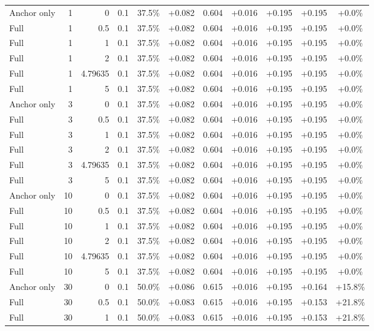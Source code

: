 \begin{table}[htbp]
\begin{tabular}{lrrrccccccc}
Anchor only & 1 & 0 & 0.1 & 37.5\% & +0.082 & 0.604 & +0.016 & +0.195 & +0.195 & +0.0\% \\
Full & 1 & 0.5 & 0.1 & 37.5\% & +0.082 & 0.604 & +0.016 & +0.195 & +0.195 & +0.0\% \\
Full & 1 & 1 & 0.1 & 37.5\% & +0.082 & 0.604 & +0.016 & +0.195 & +0.195 & +0.0\% \\
Full & 1 & 2 & 0.1 & 37.5\% & +0.082 & 0.604 & +0.016 & +0.195 & +0.195 & +0.0\% \\
Full & 1 & 4.79635 & 0.1 & 37.5\% & +0.082 & 0.604 & +0.016 & +0.195 & +0.195 & +0.0\% \\
Full & 1 & 5 & 0.1 & 37.5\% & +0.082 & 0.604 & +0.016 & +0.195 & +0.195 & +0.0\% \\
Anchor only & 3 & 0 & 0.1 & 37.5\% & +0.082 & 0.604 & +0.016 & +0.195 & +0.195 & +0.0\% \\
Full & 3 & 0.5 & 0.1 & 37.5\% & +0.082 & 0.604 & +0.016 & +0.195 & +0.195 & +0.0\% \\
Full & 3 & 1 & 0.1 & 37.5\% & +0.082 & 0.604 & +0.016 & +0.195 & +0.195 & +0.0\% \\
Full & 3 & 2 & 0.1 & 37.5\% & +0.082 & 0.604 & +0.016 & +0.195 & +0.195 & +0.0\% \\
Full & 3 & 4.79635 & 0.1 & 37.5\% & +0.082 & 0.604 & +0.016 & +0.195 & +0.195 & +0.0\% \\
Full & 3 & 5 & 0.1 & 37.5\% & +0.082 & 0.604 & +0.016 & +0.195 & +0.195 & +0.0\% \\
Anchor only & 10 & 0 & 0.1 & 37.5\% & +0.082 & 0.604 & +0.016 & +0.195 & +0.195 & +0.0\% \\
Full & 10 & 0.5 & 0.1 & 37.5\% & +0.082 & 0.604 & +0.016 & +0.195 & +0.195 & +0.0\% \\
Full & 10 & 1 & 0.1 & 37.5\% & +0.082 & 0.604 & +0.016 & +0.195 & +0.195 & +0.0\% \\
Full & 10 & 2 & 0.1 & 37.5\% & +0.082 & 0.604 & +0.016 & +0.195 & +0.195 & +0.0\% \\
Full & 10 & 4.79635 & 0.1 & 37.5\% & +0.082 & 0.604 & +0.016 & +0.195 & +0.195 & +0.0\% \\
Full & 10 & 5 & 0.1 & 37.5\% & +0.082 & 0.604 & +0.016 & +0.195 & +0.195 & +0.0\% \\
Anchor only & 30 & 0 & 0.1 & 50.0\% & +0.086 & 0.615 & +0.016 & +0.195 & +0.164 & +15.8\% \\
Full & 30 & 0.5 & 0.1 & 50.0\% & +0.083 & 0.615 & +0.016 & +0.195 & +0.153 & +21.8\% \\
Full & 30 & 1 & 0.1 & 50.0\% & +0.083 & 0.615 & +0.016 & +0.195 & +0.153 & +21.8\% \\

\end{tabular}
\end{table}
